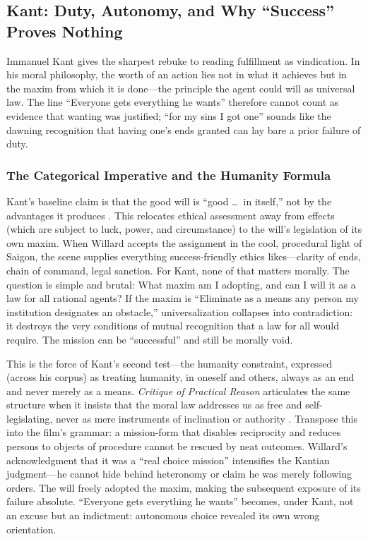 \subsection*{Kant: Duty, Autonomy, and Why ``Success'' Proves Nothing}
\label{ssec:iii-kant}
Immanuel Kant gives the sharpest rebuke to reading fulfillment as vindication. In his moral
philosophy, the worth of an action lies not in what it achieves but in the maxim from which
it is done—the
principle the agent could will as universal law. The line ``Everyone gets everything he wants''
therefore cannot count as evidence that wanting was justified; ``for my sins I got one'' sounds
like the dawning recognition that having one's ends granted can lay bare a prior failure of
duty.

\subsubsection*{The Categorical Imperative and the Humanity Formula}

Kant's baseline claim is that the good will is ``good \ldots\ in itself,'' not by the
advantages it produces \parencite[p.~27]{KantCPrR1996}. This relocates ethical assessment away
from effects (which are subject to luck, power, and circumstance) to the will's legislation of
its own maxim. When Willard accepts the assignment in the cool, procedural light of Saigon,
the scene supplies everything success-friendly ethics likes—clarity of ends, chain of command,
legal sanction. For Kant, none of that matters morally. The question is simple and brutal:
What maxim am I adopting, and can I will it as a law for all rational agents? If the maxim is
``Eliminate as a means any person my institution designates an obstacle,'' universalization
collapses into contradiction: it destroys the very conditions of mutual recognition that a law
for all would require. The mission can be ``successful'' and still be morally void.

This is the force of Kant's second test—the humanity constraint, expressed (across his corpus)
as treating humanity, in oneself and others, always as an end and never merely as a means.
\emph{Critique of Practical Reason} articulates the same structure when it insists that the
moral law addresses us as free and self-legislating, never as mere instruments of inclination
or authority \parencite[pp.~30--33]{KantCPrR1996}. Transpose this into the film's grammar:
a mission-form that disables reciprocity and reduces persons to objects of procedure cannot be
rescued by neat outcomes. Willard's acknowledgment that it was a ``real choice mission''
intensifies the Kantian judgment---he cannot hide behind heteronomy or claim he was merely
following orders. The will freely adopted the maxim, making the subsequent exposure of its
failure absolute. ``Everyone gets everything he wants'' becomes, under Kant, not an excuse but
an indictment: autonomous choice revealed its own wrong orientation.

